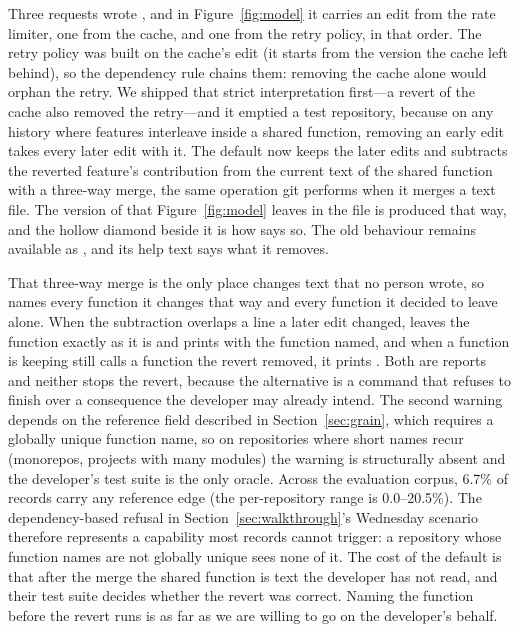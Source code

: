 Three requests wrote , and in Figure~\ref{fig:model} it carries
an edit from the rate limiter, one from the cache, and one from the retry policy, in
that order. The retry policy was built on the cache's edit (it starts from the
version the cache left behind), so the dependency rule chains them: removing the
cache alone would orphan the retry. We shipped that strict interpretation first---a
revert of the cache also removed the retry---and it emptied a test repository,
because on any history where features interleave inside a shared function, removing
an early edit takes every later edit with it. The default now keeps the later edits
and subtracts the reverted feature's contribution from the current text of the
shared function with a three-way merge, the same operation git performs when it
merges a text file. The version of
 that Figure~\ref{fig:model} leaves in the file is produced that
way, and the hollow diamond beside it is how \sgt{} says so. The old behaviour
remains available as , and its help text says what it
removes.

That three-way merge is the only place \sgt{} changes text that no person wrote, so
\sgt{} names every function it changes that way and every function it decided to
leave alone. When the subtraction overlaps a line a later edit changed, \sgt{} leaves
the function exactly as it is and prints  with the function named, and when a function
\sgt{} is keeping still calls a function the revert removed, it prints
. Both are reports and neither stops the revert, because the alternative is a
command that refuses to finish over a consequence the developer may already
intend. The second warning depends on the reference field described in
Section~\ref{sec:grain}, which requires a globally unique function name, so on
repositories where short names recur (monorepos, projects with many modules) the
warning is structurally absent and the developer's test suite is the only oracle.
Across the evaluation corpus, 6.7\% of records carry any reference edge (the
per-repository range is 0.0--20.5\%). The dependency-based refusal in
Section~\ref{sec:walkthrough}'s Wednesday scenario therefore represents a
capability most records cannot trigger: a repository whose function names are not
globally unique sees none of it. The cost of the default is that after the merge the shared function is text the
developer has not read, and their test suite decides whether the revert was
correct. Naming the function before the revert runs is as far as we are willing
to go on the developer's behalf.


